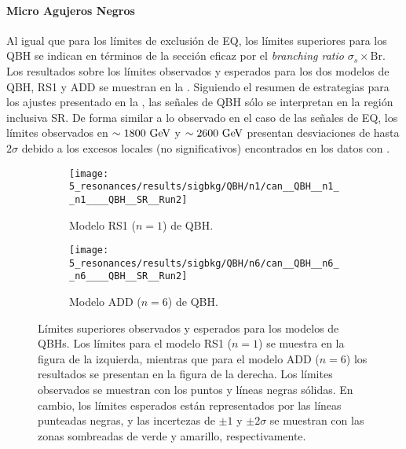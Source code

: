 \paragraph{Micro Agujeros Negros}
\label{paragraph:results:results:bkgsig:results:qbh}

Al igual que para los límites de exclusión de \ac{EQ}, los límites superiores para los \ac{QBH} se indican en términos de la sección eficaz por el \textit{branching ratio} \(\sigma_s \times \text{Br}\).
Los resultados sobre los límites observados y esperados para los dos modelos de \ac{QBH}, RS1 y ADD se muestran en la \Fig{\ref{fig:results:results:bkgsig:results:qbh:limits}}. Siguiendo el resumen de estrategias para los ajustes presentado en la \Tab{\ref{tab:bkg:modeling:strategy_modeling:summary}}, las señales de \ac{QBH} sólo se interpretan en la región inclusiva SR. De forma similar a lo observado en el caso de las señales de \ac{EQ}, los límites observados en \(\sim 1800~\text{GeV}\) y \(\sim 2600~\text{GeV}\) presentan desviaciones de hasta \(2\sigma\) debido a los excesos locales (no significativos) encontrados en los datos con \bh.

\begin{figure}[ht!]
    \centering
    \begin{subfigure}[h]{0.49\linewidth}
        \centering
        \texttt{[image: 5\_resonances/results/sigbkg/QBH/n1/can\_\_QBH\_\_n1\_\_n1\_\_\_\_QBH\_\_SR\_\_Run2]}
        \caption{Modelo RS1 (\(n=1\)) de \ac{QBH}.}
    \end{subfigure}
    \hfill
    \begin{subfigure}[h]{0.49\linewidth}
        \centering
        \texttt{[image: 5\_resonances/results/sigbkg/QBH/n6/can\_\_QBH\_\_n6\_\_n6\_\_\_\_QBH\_\_SR\_\_Run2]}
        \caption{Modelo ADD (\(n=6\)) de \ac{QBH}.}
    \end{subfigure}
    \caption{Límites superiores observados y esperados para los modelos de \acp{QBH}. Los límites para el modelo RS1 (\(n=1\)) se muestra en la figura de la izquierda, mientras que para el modelo ADD (\(n=6\)) los resultados se presentan en la figura de la derecha. Los límites observados se muestran con los puntos y líneas negras sólidas. En cambio, los límites esperados están representados por las líneas punteadas negras, y las incertezas de \(\pm 1\) y \(\pm 2 \sigma\) se muestran con las zonas sombreadas de verde y amarillo, respectivamente.}
    \label{fig:results:results:bkgsig:results:qbh:limits}
\end{figure}


